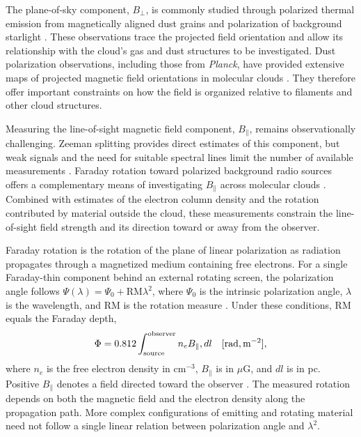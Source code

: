 \documentclass[twocolumn]{aastex701}
\begin{document}
The plane-of-sky component, $B_\perp$, is commonly studied through polarized thermal emission from magnetically aligned dust grains and polarization of background starlight \citep{heiles20009286,andersson2015interstellar}. These observations trace the projected field orientation and allow its relationship with the cloud's gas and dust structures to be investigated. Dust polarization observations, including those from \textit{Planck}, have provided extensive maps of projected magnetic field orientations in molecular clouds \citep{planck2016,soler2019using}. They therefore offer important constraints on how the field is organized relative to filaments and other cloud structures.

Measuring the line-of-sight magnetic field component, $B_\parallel$, remains observationally challenging. Zeeman splitting provides direct estimates of this component, but weak signals and the need for suitable spectral lines limit the number of available measurements \citep{crutcher1999detection,crutcher2010magnetic,crutcher2019review}. Faraday rotation toward polarized background radio sources offers a complementary means of investigating $B_\parallel$ across molecular clouds \citep{wolleben2004,tahani2018}. Combined with estimates of the electron column density and the rotation contributed by material outside the cloud, these measurements constrain the line-of-sight field strength and its direction toward or away from the observer.

Faraday rotation is the rotation of the plane of linear polarization as radiation propagates through a magnetized medium containing free electrons. For a single Faraday-thin component behind an external rotating screen, the polarization angle follows
$\Psi(\lambda)=\Psi_0+\mathrm{RM}\lambda^2$, where $\Psi_0$ is the intrinsic polarization angle, $\lambda$ is the wavelength, and $\mathrm{RM}$ is the rotation measure \citep{burn1966,brentjens2005}. Under these conditions, RM equals the Faraday depth,
\begin{equation}
\label{eq:rm-basic}
\Phi = 0.812 \int_{\rm source}^{\rm observer} n_e B_\parallel,dl
\quad [\mathrm{rad,m^{-2}}],
\end{equation}
where $n_e$ is the free electron density in cm$^{-3}$, $B_\parallel$ is in $\mu$G, and $dl$ is in pc. Positive $B_\parallel$ denotes a field directed toward the observer \citep{han2017observing}. The measured rotation depends on both the magnetic field and the electron density along the propagation path. More complex configurations of emitting and rotating material need not follow a single linear relation between polarization angle and $\lambda^2$.
\end{document}
